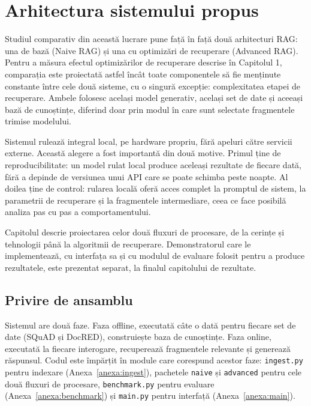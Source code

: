 \chapter{Arhitectura sistemului propus}

Studiul comparativ din această lucrare pune față în față două arhitecturi RAG: una de bază (Naive RAG) și una cu optimizări de recuperare (Advanced RAG). Pentru a măsura efectul optimizărilor de recuperare descrise în Capitolul 1, comparația este proiectată astfel încât toate componentele să fie menținute constante între cele două sisteme, cu o singură excepție: complexitatea etapei de recuperare. Ambele folosesc același model generativ, același set de date și aceeași bază de cunoștințe, diferind doar prin modul în care sunt selectate fragmentele trimise modelului.

Sistemul rulează integral local, pe hardware propriu, fără apeluri către servicii externe. Această alegere a fost importantă din două motive. Primul ține de reproducibilitate: un model rulat local produce aceleași rezultate de fiecare dată, fără a depinde de versiunea unui API care se poate schimba peste noapte. Al doilea ține de control: rularea locală oferă acces complet la promptul de sistem, la parametrii de recuperare și la fragmentele intermediare, ceea ce face posibilă analiza pas cu pas a comportamentului.

Capitolul descrie proiectarea celor două fluxuri de procesare, de la cerințe și tehnologii până la algoritmii de recuperare. Demonstratorul care le implementează, cu interfața sa și cu modulul de evaluare folosit pentru a produce rezultatele, este prezentat separat, la finalul capitolului de rezultate.

\section{Privire de ansamblu}

Sistemul are două faze. Faza offline, executată câte o dată pentru fiecare set de date (SQuAD și DocRED), construiește baza de cunoștințe. Faza online, executată la fiecare interogare, recuperează fragmentele relevante și generează răspunsul. Codul este împărțit în module care corespund acestor faze: \texttt{ingest.py} pentru indexare (Anexa~\ref{anexa:ingest}), pachetele \texttt{naive} și \texttt{advanced} pentru cele două fluxuri de procesare, \texttt{benchmark.py} pentru evaluare (Anexa~\ref{anexa:benchmark}) și \texttt{main.py} pentru interfață (Anexa~\ref{anexa:main}).

